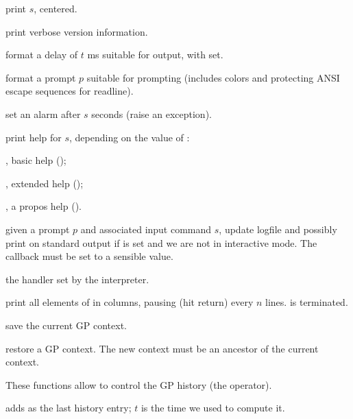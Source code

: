  print $s$, centered.

 print verbose version information.

 format a delay of $t$ ms
suitable for  output, with  set.

 format a prompt $p$
suitable for  prompting (includes colors and protecting ANSI escape
sequences for readline).

 set an alarm after $s$ seconds (raise an
 exception).

 print help for $s$, depending
on the value of \fl:

\item {}, basic help ();

\item {}, extended help ();

\item {}, a propos help ().

 given a prompt
$p$ and associated input command $s$, update logfile and possibly
print on standard output if  is set and we are not in interactive
mode. The callback  must be set to a sensible
value.

 the  handler
set by the  interpreter.

print all elements of  in columns, pausing (hit return)
every $n$ lines.  is  terminated.


 save the current GP
context.

 restore a GP context.
The new context must be an ancestor of the current context.


These functions allow to control the GP history (the \kbd{\%} operator).

 adds  as the last history
entry; $t$ is the time we used to compute it.

